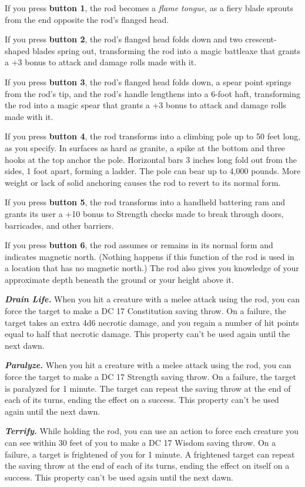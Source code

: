 \documentclass[
]{article}
\begin{document}
If you press \textbf{button 1}, the rod becomes a \emph{flame tongue},
as a fiery blade sprouts from the end opposite the rod's flanged head.

If you press \textbf{button 2}, the rod's flanged head folds down and
two crescent-shaped blades spring out, transforming the rod into a magic
battleaxe that grants a +3 bonus to attack and damage rolls made with
it.

If you press \textbf{button 3}, the rod's flanged head folds down, a
spear point springs from the rod's tip, and the rod's handle lengthens
into a 6-foot haft, transforming the rod into a magic spear that grants
a +3 bonus to attack and damage rolls made with it.

If you press \textbf{button 4}, the rod transforms into a climbing pole
up to 50 feet long, as you specify. In surfaces as hard as granite, a
spike at the bottom and three hooks at the top anchor the pole.
Horizontal bars 3 inches long fold out from the sides, 1 foot apart,
forming a ladder. The pole can bear up to 4,000 pounds. More weight or
lack of solid anchoring causes the rod to revert to its normal form.

If you press \textbf{button 5}, the rod transforms into a handheld
battering ram and grants its user a +10 bonus to Strength checks made to
break through doors, barricades, and other barriers.

If you press \textbf{button 6}, the rod assumes or remains in its normal
form and indicates magnetic north. (Nothing happens if this function of
the rod is used in a location that has no magnetic north.) The rod also
gives you knowledge of your approximate depth beneath the ground or your
height above it.

\emph{\textbf{Drain Life.}} When you hit a creature with a melee attack
using the rod, you can force the target to make a DC 17 Constitution
saving throw. On a failure, the target takes an extra 4d6 necrotic
damage, and you regain a number of hit points equal to half that
necrotic damage. This property can't be used again until the next dawn.

\emph{\textbf{Paralyze.}} When you hit a creature with a melee attack
using the rod, you can force the target to make a DC 17 Strength saving
throw. On a failure, the target is paralyzed for 1 minute. The target
can repeat the saving throw at the end of each of its turns, ending the
effect on a success. This property can't be used again until the next
dawn.

\emph{\textbf{Terrify.}} While holding the rod, you can use an action to
force each creature you can see within 30 feet of you to make a DC 17
Wisdom saving throw. On a failure, a target is frightened of you for 1
minute. A frightened target can repeat the saving throw at the end of
each of its turns, ending the effect on itself on a success. This
property can't be used again until the next dawn.
\end{document}

